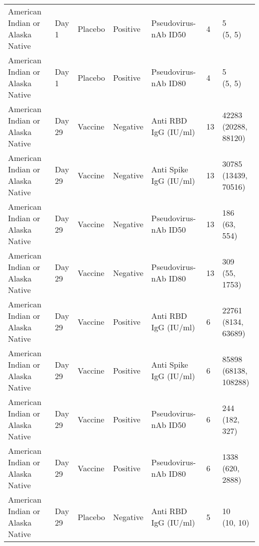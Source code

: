 \documentclass[]{book}
\theoremstyle{definition}
\theoremstyle{definition}
\theoremstyle{definition}
\newcommand{\1}{\mathbbm{1}}
\begin{document}
\begin{landscape}
\begin{ThreePartTable}
\begin{longtable}[t]{>{\raggedright\arraybackslash}p{7cm}llllll}
\hspace{1em}American Indian or Alaska Native & Day 1 & Placebo & Positive & Pseudovirus-nAb ID50 & 4 & \makecell[l]{5\\(5, 5)}\\
\hspace{1em}American Indian or Alaska Native & Day 1 & Placebo & Positive & Pseudovirus-nAb ID80 & 4 & \makecell[l]{5\\(5, 5)}\\
\hspace{1em}American Indian or Alaska Native & Day 29 & Vaccine & Negative & Anti RBD IgG (IU/ml) & 13 & \makecell[l]{42283\\(20288, 88120)}\\
\hspace{1em}American Indian or Alaska Native & Day 29 & Vaccine & Negative & Anti Spike IgG (IU/ml) & 13 & \makecell[l]{30785\\(13439, 70516)}\\
\hspace{1em}American Indian or Alaska Native & Day 29 & Vaccine & Negative & Pseudovirus-nAb ID50 & 13 & \makecell[l]{186\\(63, 554)}\\
\hspace{1em}American Indian or Alaska Native & Day 29 & Vaccine & Negative & Pseudovirus-nAb ID80 & 13 & \makecell[l]{309\\(55, 1753)}\\
\hspace{1em}American Indian or Alaska Native & Day 29 & Vaccine & Positive & Anti RBD IgG (IU/ml) & 6 & \makecell[l]{22761\\(8134, 63689)}\\
\hspace{1em}American Indian or Alaska Native & Day 29 & Vaccine & Positive & Anti Spike IgG (IU/ml) & 6 & \makecell[l]{85898\\(68138, 108288)}\\
\hspace{1em}American Indian or Alaska Native & Day 29 & Vaccine & Positive & Pseudovirus-nAb ID50 & 6 & \makecell[l]{244\\(182, 327)}\\
\hspace{1em}American Indian or Alaska Native & Day 29 & Vaccine & Positive & Pseudovirus-nAb ID80 & 6 & \makecell[l]{1338\\(620, 2888)}\\
\hspace{1em}American Indian or Alaska Native & Day 29 & Placebo & Negative & Anti RBD IgG (IU/ml) & 5 & \makecell[l]{10\\(10, 10)}\\

\end{longtable}
\end{ThreePartTable}
\end{landscape}
\end{document}
